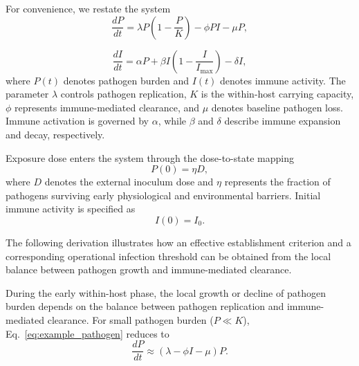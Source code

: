 \documentclass[11pt]{article}
\begin{document}
For convenience, we restate the system
\begin{equation}
\frac{dP}{dt}
=
\lambda P\left(1-\frac{P}{K}\right)
-\phi PI
-\mu P,
\label{eq:example_pathogen}
\end{equation}

\begin{equation}
\frac{dI}{dt}
=
\alpha P
+
\beta I\left(1-\frac{I}{I_{\max}}\right)
-
\delta I,
\label{eq:example_immune}
\end{equation}
where $P(t)$ denotes pathogen burden and $I(t)$ denotes immune activity.
The parameter $\lambda$ controls pathogen replication,
$K$ is the within-host carrying capacity,
$\phi$ represents immune-mediated clearance,
and $\mu$ denotes baseline pathogen loss.
Immune activation is governed by $\alpha$,
while $\beta$ and $\delta$ describe immune expansion and decay, respectively.

Exposure dose enters the system through the dose-to-state mapping
\begin{equation}
P(0)=\eta D,
\label{eq:example_initial}
\end{equation}
where $D$ denotes the external inoculum dose and $\eta$ represents the fraction of pathogens surviving early physiological and environmental barriers.
Initial immune activity is specified as
\begin{equation}
I(0)=I_0.
\end{equation}




The following derivation illustrates how an effective establishment
criterion and a corresponding operational infection threshold can be
obtained from the local balance between pathogen growth and immune-mediated
clearance. 

During the early within-host phase, the local growth
or decline of pathogen burden depends on the balance
between pathogen replication and immune-mediated
clearance. For small pathogen burden ($P\ll K$), Eq.~\eqref{eq:example_pathogen}
reduces to
\begin{equation}
\frac{dP}{dt}
\approx
(\lambda-\phi I-\mu)P.
\end{equation}
\end{document}
